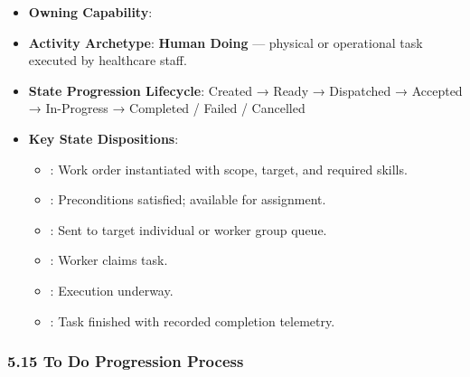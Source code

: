 \begin{itemize}

\item
\textbf{Owning Capability}: \texttt{}



\item
\textbf{Activity Archetype}: \textbf{Human Doing} — physical or operational task executed by healthcare staff.



\item
\textbf{State Progression Lifecycle}: Created → Ready → Dispatched → Accepted → In-Progress → Completed /\allowbreak{} Failed /\allowbreak{} Cancelled



\item
\textbf{Key State Dispositions}:


\begin{itemize}

\item
\texttt{}: Work order instantiated with scope, target, and required skills.



\item
\texttt{}: Preconditions satisfied; available for assignment.



\item
\texttt{}: Sent to target individual or worker group queue.



\item
\texttt{}: Worker claims task.



\item
\texttt{}: Execution underway.



\item
\texttt{}: Task finished with recorded completion telemetry.



\end{itemize}


\end{itemize}
\label{rad:processes:295}

\par\smallskip
{}\label{rad:processes:297}
\subsubsection*{5.15 To Do Progression Process}
\label{rad:processes:298}

